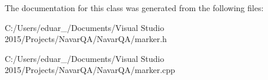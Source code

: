 The documentation for this class was generated from the following files\+:\begin{DoxyCompactItemize}
\item 
C\+:/\+Users/eduar\+\_/\+Documents/\+Visual Studio 2015/\+Projects/\+Navar\+Q\+A/\+Navar\+Q\+A/marker.\+h\item 
C\+:/\+Users/eduar\+\_/\+Documents/\+Visual Studio 2015/\+Projects/\+Navar\+Q\+A/\+Navar\+Q\+A/marker.\+cpp\end{DoxyCompactItemize}
